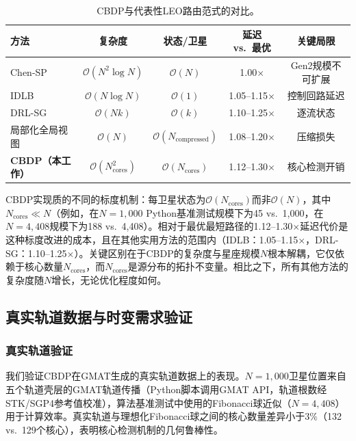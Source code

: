 \documentclass[sn-nature,pdflatex]{sn-jnl}
\begin{document}
\begin{table}[htbp]
\centering
\caption{CBDP与代表性LEO路由范式的对比。}
\label{tab:routing_comparison}
\begin{tabular}{lcccc}
\toprule
方法 & 复杂度 & 状态/卫星 & 延迟 vs.\ 最优 & 关键局限 \\
\midrule
Chen-SP~\cite{chen_2024_jsac} & $\mathcal{O}(N^2\log N)$ & $\mathcal{O}(N)$ & 1.00$\times$ & Gen2规模不可扩展 \\
IDLB~\cite{roth_2025_idlb} & $\mathcal{O}(N\log N)$ & $\mathcal{O}(1)$ & 1.05--1.15$\times$ & 控制回路延迟 \\
DRL-SG~\cite{li_2025_tmc} & $\mathcal{O}(Nk)$ & $\mathcal{O}(k)$ & 1.10--1.25$\times$ & 逐流状态 \\
局部化全局视图~\cite{yan_2024_galor} & $\mathcal{O}(N)$ & $\mathcal{O}(N_{\text{compressed}})$ & 1.08--1.20$\times$ & 压缩损失 \\
\textbf{CBDP（本工作）} & $\mathcal{O}(N_{\text{cores}}^2)$ & $\mathcal{O}(N_{\text{cores}})$ & 1.12--1.30$\times$ & 核心检测开销 \\
\bottomrule
\end{tabular}
\end{table}

CBDP实现质的不同的标度机制：每卫星状态为$\mathcal{O}(N_{\text{cores}})$而非$\mathcal{O}(N)$，其中$N_{\text{cores}} \ll N$（例如，在$N=1,000$ Python基准测试规模下为45 vs.\ 1,000，在$N=4,408$规模下为188 vs.\ 4,408）。相对于最优最短路径的1.12--1.30$\times$延迟代价是这种标度改进的成本，且在其他实用方法的范围内（IDLB：1.05--1.15$\times$，DRL-SG：1.10--1.25$\times$）。关键区别在于CBDP的复杂度与星座规模$N$根本解耦，它仅依赖于核心数量$N_{\text{cores}}$，而$N_{\text{cores}}$是源分布的拓扑不变量。相比之下，所有其他方法的复杂度随$N$增长，无论优化程度如何。

\subsection{真实轨道数据与时变需求验证}
\label{sec:real_orbit}

\subsubsection{真实轨道验证}

我们验证CBDP在GMAT生成的真实轨道数据上的表现。$N=1,000$卫星位置来自五个轨道壳层的GMAT轨道传播（Python脚本调用GMAT API，轨道根数经STK/SGP4参考值校准），算法基准测试中使用的Fibonacci球近似（$N=4,408$）用于计算效率。真实轨道与理想化Fibonacci球之间的核心数量差异小于$3\%$（132 vs.\ 129个核心），表明核心检测机制的几何鲁棒性。
\end{document}
